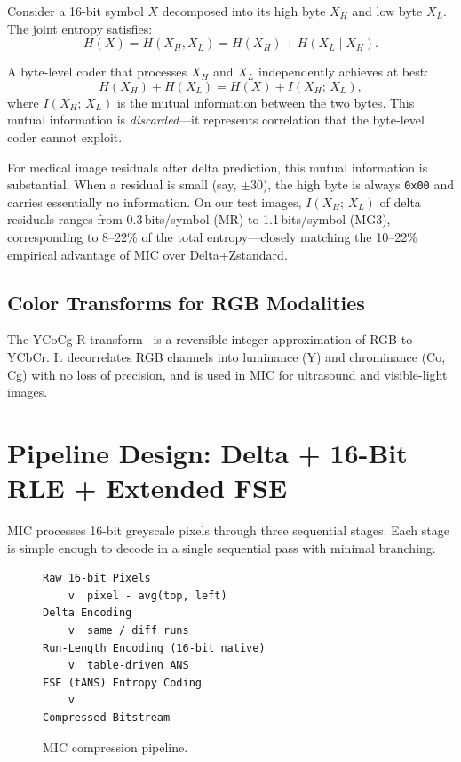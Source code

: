\documentclass[journal]{IEEEtran}
\begin{document}
Consider a 16-bit symbol $X$ decomposed into its high byte $X_H$ and low byte
$X_L$. The joint entropy satisfies:
\begin{equation}
  H(X) = H(X_H, X_L) = H(X_H) + H(X_L \mid X_H).
\end{equation}

A byte-level coder that processes $X_H$ and $X_L$ independently achieves at
best:
\begin{equation}
  H(X_H) + H(X_L) = H(X) + I(X_H;\, X_L),
\end{equation}
where $I(X_H;\, X_L)$ is the mutual information between the two bytes. This
mutual information is \emph{discarded}---it represents correlation that the
byte-level coder cannot exploit.

For medical image residuals after delta prediction, this mutual information is
substantial. When a residual is small (say, $\pm 30$), the high byte is always
\texttt{0x00} and carries essentially no information. On our test images,
$I(X_H;\, X_L)$ of delta residuals ranges from 0.3\,bits/symbol (MR) to
1.1\,bits/symbol (MG3), corresponding to 8--22\% of the total entropy---closely
matching the 10--22\% empirical advantage of MIC over Delta+Zstandard.

\subsection{Color Transforms for RGB Modalities}

The YCoCg-R transform~\cite{ycocgr} is a reversible integer approximation of
RGB-to-YCbCr. It decorrelates RGB channels into luminance (Y) and chrominance
(Co, Cg) with no loss of precision, and is used in MIC for ultrasound and
visible-light images.

\section{Pipeline Design: Delta + 16-Bit RLE + Extended FSE}
\label{sec:pipeline}

MIC processes 16-bit greyscale pixels through three sequential stages. Each
stage is simple enough to decode in a single sequential pass with minimal
branching.

\begin{figure}[htbp]
\centering
\begin{lstlisting}
Raw 16-bit Pixels
    v  pixel - avg(top, left)
Delta Encoding
    v  same / diff runs
Run-Length Encoding (16-bit native)
    v  table-driven ANS
FSE (tANS) Entropy Coding
    v
Compressed Bitstream
\end{lstlisting}
\caption{MIC compression pipeline.}
\label{fig:pipeline}
\end{figure}
\end{document}
